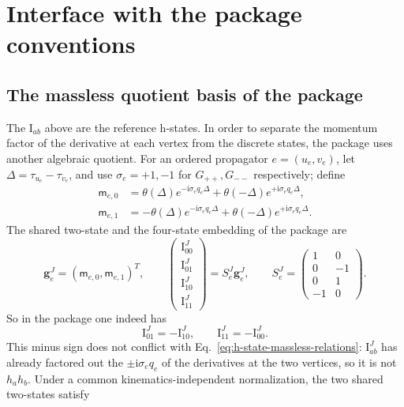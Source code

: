 \documentclass[11pt,a4paper]{article}
\newcommand{\ii}{\mathrm i}
\begin{document}
\section{Interface with the package conventions}
\label{sec:package-adapter}

\subsection{The massless quotient basis of the package}

The $\text{I}_{ab}$ above are the reference h-states. In order to separate the momentum factor of the derivative at each vertex from the discrete states, the package uses another algebraic quotient. For an ordered propagator $e=(u_e,v_e)$, let $\Delta=\tau_{u_e}-\tau_{v_e}$, and use $\sigma_e=+1,-1$ for $G_{++},G_{--}$ respectively; define
\begin{align}
 \mathsf m_{e,0}&=\theta(\Delta)e^{-\ii\sigma_eq_e\Delta}
       +\theta(-\Delta)e^{+\ii\sigma_eq_e\Delta},\\
 \mathsf m_{e,1}&=-\theta(\Delta)e^{-\ii\sigma_eq_e\Delta}
       +\theta(-\Delta)e^{+\ii\sigma_eq_e\Delta}.
 \label{eq:package-M01}
\end{align}
The shared two-state and the four-state embedding of the package are
\begin{equation}
 \bm g_e^J=(\mathsf m_{e,0},\mathsf m_{e,1})^T,
 \qquad
 \begin{pmatrix}\text{I}^J_{00}\\\text{I}^J_{01}\\\text{I}^J_{10}\\\text{I}^J_{11}\end{pmatrix}
 =S_e^J\bm g_e^J,
 \qquad
 S_e^J=
 \begin{pmatrix}
  1&0\\0&-1\\0&1\\-1&0
 \end{pmatrix}.
 \label{eq:package-S-massless}
\end{equation}
So in the package one indeed has
\begin{equation}
 \text{I}^J_{01}=-\text{I}^J_{10},
 \qquad
 \text{I}^J_{11}=-\text{I}^J_{00}.
 \label{eq:package-quotient-relations}
\end{equation}
This minus sign does not conflict with Eq.~\eqref{eq:h-state-massless-relations}: $\text{I}^J_{ab}$ has already factored out the $\pm\ii\sigma_eq_e$ of the derivatives at the two vertices, so it is not $h_a h_b$. Under a common kinematics-independent normalization, the two shared two-states satisfy
\end{document}
